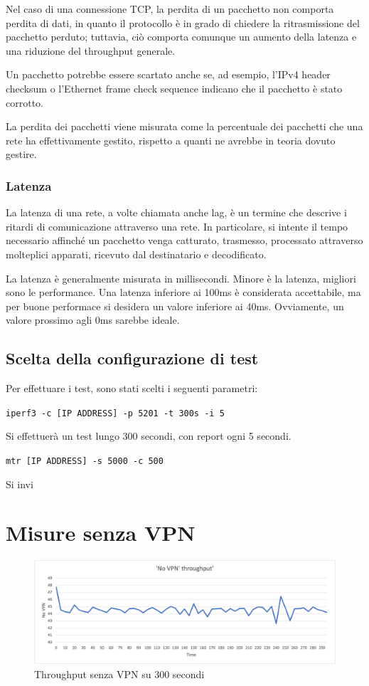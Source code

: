 Nel caso di una connessione TCP, la perdita di un pacchetto non comporta perdita di dati, in quanto il protocollo è in grado di chiedere la ritrasmissione del pacchetto perduto; tuttavia, ciò comporta comunque un aumento della latenza e una riduzione del throughput generale.

Un pacchetto potrebbe essere scartato anche se, ad esempio, l'IPv4 header checksum o l'Ethernet frame check sequence indicano che il pacchetto è stato corrotto.

La perdita dei pacchetti viene misurata come la percentuale dei pacchetti che una rete ha effettivamente gestito, rispetto a quanti ne avrebbe in teoria dovuto gestire.


\subsubsection{Latenza}
La latenza di una rete, a volte chiamata anche lag, è un termine che descrive i ritardi di comunicazione attraverso una rete. In particolare, si intente il tempo necessario affinché un pacchetto venga catturato, trasmesso, processato attraverso molteplici apparati, ricevuto dal destinatario e decodificato.

La latenza è generalmente misurata in millisecondi. Minore è la latenza, migliori sono le performance. Una latenza inferiore ai 100ms è considerata accettabile, ma per buone performace si desidera un valore inferiore ai 40ms. Ovviamente, un valore prossimo agli 0ms sarebbe ideale.

\subsection{Scelta della configurazione di test}
Per effettuare i test, sono stati scelti i seguenti parametri:


\texttt{iperf3 -c [IP ADDRESS] -p 5201 -t 300s -i 5}


Si effettuerà un test lungo 300 secondi, con report ogni 5 secondi.

\texttt{mtr [IP ADDRESS] -s 5000 -c 500}


Si invi

\section{Misure senza VPN}
\begin{figure}[ht]
    \centering
    \includegraphics[width=12cm]{figure/vpn_thr.png-1.png}
    \caption{Throughput senza VPN su 300 secondi}
\end{figure}


